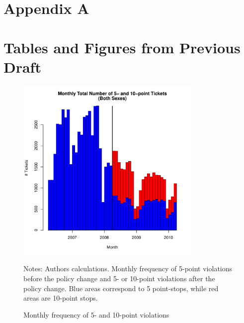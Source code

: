 
\pagebreak

\section*{Appendix A}
\vspace{3.0in}

\section*{Tables and Figures from Previous Draft}
\label{sec:Appendix}

\vfill
\eject



\begin{figure}
\centering
\includegraphics[width=0.8\textwidth]{../Figures/num_pts_5_10_all_orig.pdf}
\caption{Monthly frequency of 5- and 10-point violations }
Notes: Authors calculations. Monthly frequency of 5-point violations before the policy change and 5- or 10-point violations after the policy change. Blue areas correspond to 5 point-stops, while red areas are 10-point stops.
\label{fig:num_pts_5_10_all}
\end{figure}


